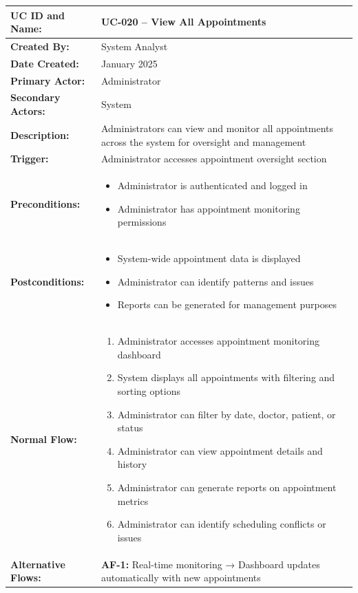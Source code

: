 \documentclass[12pt,a4paper]{article}
\begin{document}
\renewcommand{\arraystretch}{1.5}
\begin{longtable}{|p{4.5cm}|p{10.5cm}|}
\hline
\textbf{UC ID and Name:} & UC-020 – View All Appointments \\
\hline
\textbf{Created By:} & System Analyst \\
\hline
\textbf{Date Created:} & January 2025 \\
\hline
\textbf{Primary Actor:} & Administrator \\
\hline
\textbf{Secondary Actors:} & System \\
\hline
\textbf{Description:} & Administrators can view and monitor all appointments across the system for oversight and management \\
\hline
\textbf{Trigger:} & Administrator accesses appointment oversight section \\
\hline
\textbf{Preconditions:} &
\begin{itemize}
  \item Administrator is authenticated and logged in
  \item Administrator has appointment monitoring permissions
\end{itemize} \\
\hline
\textbf{Postconditions:} &
\begin{itemize}
  \item System-wide appointment data is displayed
  \item Administrator can identify patterns and issues
  \item Reports can be generated for management purposes
\end{itemize} \\
\hline
\textbf{Normal Flow:} &
\begin{enumerate}
  \item Administrator accesses appointment monitoring dashboard
  \item System displays all appointments with filtering and sorting options
  \item Administrator can filter by date, doctor, patient, or status
  \item Administrator can view appointment details and history
  \item Administrator can generate reports on appointment metrics
  \item Administrator can identify scheduling conflicts or issues
\end{enumerate} \\
\hline
\textbf{Alternative Flows:} &
\textbf{AF-1:} Real-time monitoring → Dashboard updates automatically with new appointments \\

\end{longtable}
\end{document}
